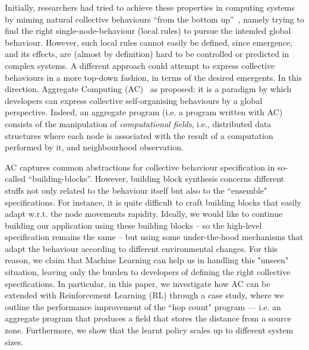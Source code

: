 \documentclass[conference]{IEEEtran}
\begin{document}
Initially, researchers had tried to achieve these properties in computing systems by miming natural collective behaviours ``from the bottom up''~\cite{DBLP:journals/connection/Webb02}, 
 namely trying to find the right single-node-behaviour (local rules)
 to pursue the intended global behaviour. %
%
However, such local rules cannot easily be defined, since emergence, and its effects, are (almost by definition) hard to be controlled or predicted in complex systems.
%
A different approach could attempt to express collective behaviours in a more top-down fashion, in terms of the desired emergents.
In this direction, Aggregate Computing (AC)~\cite{DBLP:journals/computer/BealPV15} as proposed:
 it is a paradigm by which
 developers can express collective self-organising behaviours by a global perspective. %
%
Indeed, an aggregate program 
 (i.e. a program written with AC) 
 consists of the manipulation of \textit{computational fields}, i.e., distributed
 data structures where each node is associated with the result of a computation performed by it,
 and neighbourhood observation.
%

AC captures common abstractions for collective behaviour specification in so-called ``building-blocks''. 
However, building block synthesis concerns different stuffs not only related to the behaviour itself
 but also to the ``ensemble" specifications. 
%
For instance, it is quite difficult to craft building blocks
 that easily adapt w.r.t. the node movements rapidity.
%
Ideally, we would like to continue building our application using these building blocks 
 -- so the high-level specification remains the same -- 
 but using some under-the-hood mechanisms that adapt the behaviour according to different environmental changes. 
%
For this reason, we claim that Machine Learning can help us in handling this "unseen" situation, leaving only the burden
 to developers of defining the right collective specifications.
In particular, in this paper,
 we investigate how AC can be extended with Reinforcement Learning (RL) through a case study,
 where we outline the performance improvement of the ``hop count" program ---
 i.e. an aggregate program that produces a field that stores the distance from a source zone. 
 Furthermore, we show that the learnt policy scales up to different system sizes.
\end{document}
